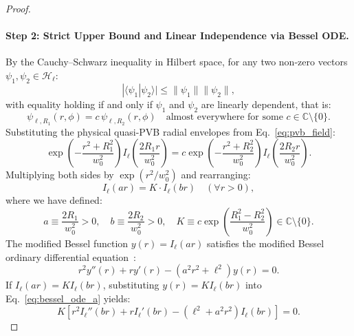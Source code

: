 \documentclass{optica-article}
\begin{document}
\begin{proof}
\paragraph{Step 2: Strict Upper Bound and Linear Independence via Bessel ODE.}
By the Cauchy--Schwarz inequality in Hilbert space, for any two non-zero vectors $\psi_1, \psi_2 \in \mathcal{H}_\ell$:
\begin{equation}
|\langle \psi_1 | \psi_2 \rangle| \le \|\psi_1\| \|\psi_2\|,
\label{eq:cauchy_schwarz}
\end{equation}
with equality holding if and only if $\psi_1$ and $\psi_2$ are linearly dependent, that is:
\begin{equation}
\psi_{\ell, R_1}(r, \phi) = c \, \psi_{\ell, R_2}(r, \phi) \quad \text{almost everywhere for some } c \in \mathbb{C} \setminus \{0\}.
\label{eq:linear_dependence_hypothesis}
\end{equation}
Substituting the physical quasi-PVB radial envelopes from Eq.~\eqref{eq:pvb_field}:
\begin{equation}
\exp\left( - \frac{r^2 + R_1^2}{w_0^2} \right) I_\ell\left( \frac{2 R_1 r}{w_0^2} \right) = c \exp\left( - \frac{r^2 + R_2^2}{w_0^2} \right) I_\ell\left( \frac{2 R_2 r}{w_0^2} \right).
\label{eq:linear_dependence_step1}
\end{equation}
Multiplying both sides by $\exp(r^2 / w_0^2)$ and rearranging:
\begin{equation}
I_\ell(a r) = K \cdot I_\ell(b r) \quad (\forall r > 0),
\label{eq:linear_dependence_step2}
\end{equation}
where we have defined:
\begin{equation}
a \equiv \frac{2 R_1}{w_0^2} > 0, \quad b \equiv \frac{2 R_2}{w_0^2} > 0, \quad K \equiv c \exp\left( \frac{R_1^2 - R_2^2}{w_0^2} \right) \in \mathbb{C} \setminus \{0\}.
\label{eq:ode_constants}
\end{equation}
The modified Bessel function $y(r) = I_\ell(a r)$ satisfies the modified Bessel ordinary differential equation~\cite{Arfken2012}:
\begin{equation}
r^2 y''(r) + r y'(r) - (a^2 r^2 + \ell^2) y(r) = 0.
\label{eq:bessel_ode_a}
\end{equation}
If $I_\ell(a r) = K I_\ell(b r)$, substituting $y(r) = K I_\ell(b r)$ into Eq.~\eqref{eq:bessel_ode_a} yields:
\begin{equation}
K \left[ r^2 I_\ell''(b r) + r I_\ell'(b r) - (\ell^2 + a^2 r^2) I_\ell(b r) \right] = 0.
\label{eq:bessel_ode_substitution}
\end{equation}

\end{proof}
\end{document}
